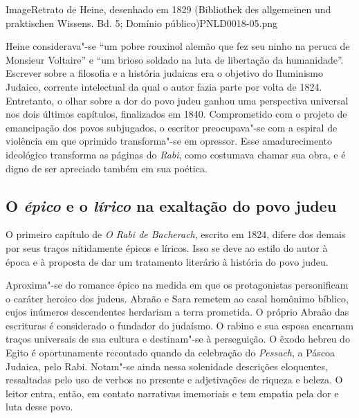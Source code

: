 \documentclass[12pt]{extarticle}
\begin{document}
Image{Retrato de Heine, desenhado em 1829 (Bibliothek des allgemeinen und praktischen Wissens. Bd. 5; Domínio público)}{PNLD0018-05.png}


Heine considerava"-se ``um pobre rouxinol alemão que fez seu ninho na
peruca de Monsieur Voltaire'' e ``um brioso soldado na luta de
libertação da humanidade''. Escrever sobre a filosofia e a história
judaicas era o objetivo do Iluminismo Judaico, corrente intelectual da
qual o autor fazia parte por volta de 1824. Entretanto, o olhar sobre a
dor do povo judeu ganhou uma perspectiva universal nos dois últimos
capítulos, finalizados em 1840. Comprometido com o projeto de
emancipação dos povos subjugados, o escritor preocupava"-se com a espiral
de violência em que oprimido transforma"-se em opressor. Esse
amadurecimento ideológico transforma as páginas do \emph{Rabi}, como costumava
chamar sua obra, e é digno de ser apreciado também em sua poética.





\subsection{O \emph{épico} e o \emph{lírico} na exaltação do povo judeu}

O primeiro capítulo de \emph{O Rabi de Bacherach}, escrito em 1824, difere dos
demais por seus traços nitidamente épicos e líricos. Isso se deve ao
estilo do autor à época e à proposta de dar um tratamento literário à
história do povo judeu.

Aproxima"-se do romance épico na medida em que os protagonistas
personificam o caráter heroico dos judeus. Abraão e Sara remetem ao
casal homônimo bíblico, cujos inúmeros descendentes herdariam a terra
prometida. O próprio Abraão das escrituras é considerado o fundador do
judaísmo. O rabino e sua esposa encarnam traços universais de sua
cultura e destinam"-se à perseguição. O êxodo hebreu do Egito é
oportunamente recontado quando da celebração do \emph{Pessach}, a Páscoa Judaica, pelo
Rabi. Notam"-se ainda nessa solenidade descrições eloquentes, ressaltadas
pelo uso de verbos no presente e adjetivações de riqueza e beleza. O
leitor entra, então, em contato narrativas imemoriais e tem empatia pela
dor e luta desse povo.


\end{document}
